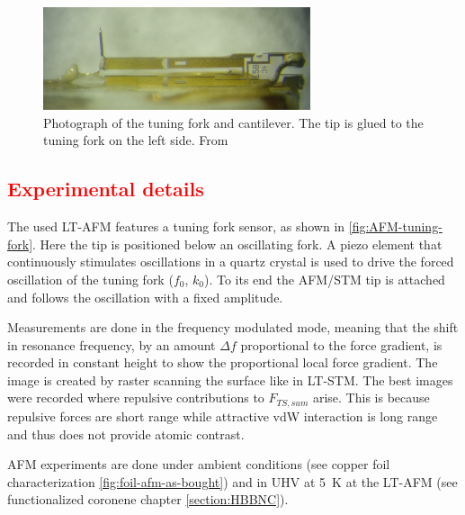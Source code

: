 \begin{figure}\centering
	\includegraphics[width=0.7\textwidth]{./images/AFM-qplus-photograph}
	\caption{Photograph of the tuning fork and cantilever. The tip is glued to the tuning fork on the left side. From \cite{he_bottom-up_2017}}
	\label{fig:AFM-tuning-fork}
\end{figure}

\subsection{\textcolor{red}{\textbf{Experimental details}}}
The used LT-AFM features a tuning fork sensor, as shown in \autoref{fig:AFM-tuning-fork}. Here the tip is positioned below an oscillating fork.  A piezo element that continuously stimulates oscillations in a quartz crystal is used to drive the forced oscillation of the tuning fork ($f_0$, $k_0$). To its end the AFM/STM tip is attached and follows the oscillation with a fixed amplitude.

Measurements are done in the frequency modulated mode, meaning that the shift in resonance frequency, by an amount $\Delta f$  proportional to the force gradient, is recorded in constant height to show the proportional local force gradient. The image is created by raster scanning the surface like in LT-STM. The best images were recorded where repulsive contributions to $F_{TS,sum}$ arise. This is because repulsive forces are short range while attractive vdW interaction is long range and thus does not provide atomic contrast.

AFM experiments are done under ambient conditions (see copper foil characterization \autoref{fig:foil-afm-as-bought}) and in UHV at \SI{5}{\kelvin} at the LT-AFM (see functionalized coronene chapter \autoref{section:HBBNC}).

%
